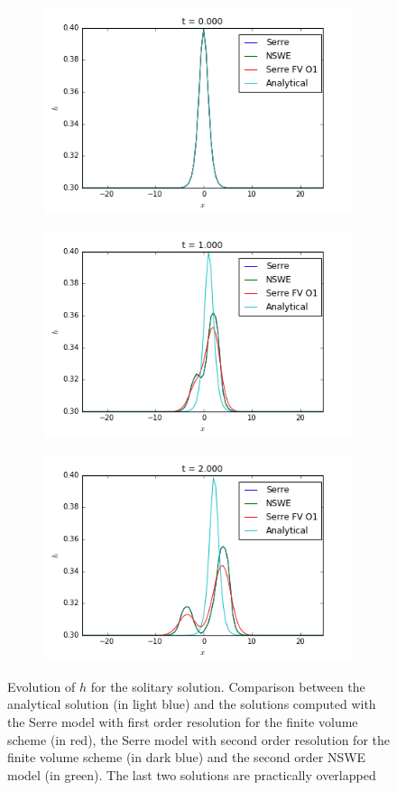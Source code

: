 \begin{figure}[h!]
	\begin{subfigure}{.3\linewidth}
		\includegraphics[scale=.3]{figures/Serre/solitary1h.png}	
	\end{subfigure}
	\begin{subfigure}{.3\linewidth}
		\includegraphics[scale=.3]{figures/Serre/solitary2h.png}	
	\end{subfigure}
	\begin{subfigure}{.3\linewidth}
		\includegraphics[scale=.3]{figures/Serre/solitary3h.png}	
	\end{subfigure}
	\caption{Evolution of $h$ for the solitary solution. Comparison between the analytical solution (in light blue) and the solutions computed with the Serre model with first order resolution for the finite volume scheme (in red), the Serre model with second order resolution for the finite volume scheme (in dark blue)  and the second order NSWE model (in green). The last two solutions are practically overlapped\label{fig:solitaryh}}
\end{figure}

